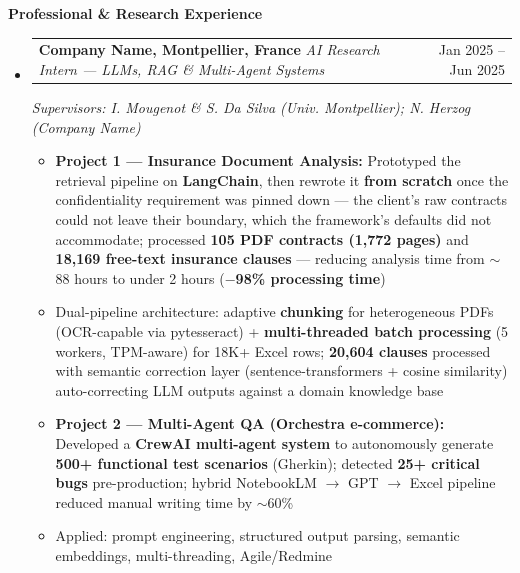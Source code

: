 \documentclass[11pt,a4paper]{article}
\makeatletter
\newcommand{\itemspace}{\vspace{0.4em}}
\newcommand{\sectionspace}{\itemspace}
\newcommand{\cvsection}[1]{
    \sectionspace
    \noindent\textcolor{primary}{\Large \textbf{#1}} \textcolor{primary}{\hrulefill}
    \par\vspace{0.4em}
}
\newcommand{\headerrow}[2]{
    \begin{tabular*}{\linewidth}{l@{\extracolsep{\fill}}r}
    #1 & \textcolor{primary}{#2} \\
    \end{tabular*}
}
\makeatother
\begin{document}
\clearpage
\cvsection{Professional \& Research Experience}
\begin{itemize}[leftmargin=1em, label={}]

    \item
    \headerrow{\textbf{Company Name, Montpellier, France} \quad \emph{AI Research Intern — LLMs, RAG \& Multi-Agent Systems}}{Jan 2025 -- Jun 2025}
    \emph{Supervisors: I. Mougenot \& S. Da Silva (Univ. Montpellier); N. Herzog (Company Name)}
    \begin{itemize}[leftmargin=1.5em, label=$\bullet$, nosep]
        \item \textbf{Project 1 — Insurance Document Analysis:} Prototyped the retrieval pipeline on \textbf{LangChain}, then rewrote it \textbf{from scratch} once the confidentiality requirement was pinned down — the client's raw contracts could not leave their boundary, which the framework's defaults did not accommodate; processed \textbf{105 PDF contracts (1,772 pages)} and \textbf{18,169 free-text insurance clauses} — reducing analysis time from $\sim$88 hours to under 2 hours (\textbf{$-$98\% processing time})
        \item Dual-pipeline architecture: adaptive \textbf{chunking} for heterogeneous PDFs (OCR-capable via pytesseract) + \textbf{multi-threaded batch processing} (5 workers, TPM-aware) for 18K+ Excel rows; \textbf{20,604 clauses} processed with semantic correction layer (sentence-transformers + cosine similarity) auto-correcting LLM outputs against a domain knowledge base
        \item \textbf{Project 2 — Multi-Agent QA (Orchestra e-commerce):} Developed a \textbf{CrewAI multi-agent system} to autonomously generate \textbf{500+ functional test scenarios} (Gherkin); detected \textbf{25+ critical bugs} pre-production; hybrid NotebookLM $\to$ GPT $\to$ Excel pipeline reduced manual writing time by $\sim$60\%
        \item Applied: prompt engineering, structured output parsing, semantic embeddings, multi-threading, Agile/Redmine
    \end{itemize}


\end{itemize}
\end{document}
